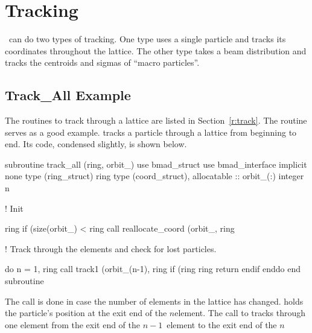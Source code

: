 \chapter{Tracking}
\label{s:tm}

\bmad\ can do two types of tracking. One type uses a single particle 
and tracks its coordinates throughout the lattice. The other type
takes a beam distribution and tracks the centroids and sigmas of
``macro particles''.  

\section{Track\_All Example}

The routines to track through a lattice are listed in
Section~\ref{r:track}. The  routine serves as a good
example.  tracks a particle through a lattice from
beginning to end. Its code, condensed slightly, is shown below.
\begin{example}
  subroutine track_all (ring, orbit_)
    use bmad_struct
    use bmad_interface
    implicit none
    type (ring_struct)  ring
    type (coord_struct), allocatable :: orbit_(:)
    integer n

  ! Init

    ring%
    if (size(orbit_) < ring%
                    call reallocate_coord (orbit_, ring%

  ! Track through the elements and check for lost particles.

    do n = 1, ring%
      call track1 (orbit_(n-1), ring%
      if (ring%
        ring%
        return
      endif
    enddo
  end subroutine
\end{example}
The  call is done in case the number of elements
in the lattice has changed.  holds the particle's
position at the exit end of the $n$\Th element. The call to
 tracks through one element from the exit end of the
$n-1$\St\ element to the exit end of the $n$\Th
